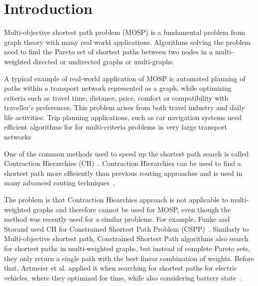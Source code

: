 % 
%  
%  
%  

\section{Introduction} \label{secIntroduction}

Multi-objective shortest path problem (MOSP) is a fundamental problem from
graph theory with many real world applications. Algorithms solving the problem
need to find the Pareto set of shortest paths between two nodes in a
multi-weighted directed or undirected graphs or multi-graphs. 

A typical example of real-world application of MOSP is automated planning of
paths within a transport network represented as a graph, while optimizing
criteria such as travel time, distance, price, comfort or compatibility with
traveller's preferences. This problem arises from both travel industry and
daily life activities. Trip planning applications, such as car navigation
systems need efficient algorithms for for multi-criteria problems in very large
transport 
networks~\cite{duque2015exact}



One of the common methods used to speed up the shortest path search  is called
Contraction Hierarchies (CH)~\cite{geisberger2008contraction}. Contraction
Hierarchies can be used to find a shortest path more efficiently than previous
routing approaches and is used in many advanced routing
techniques~\cite{delling2009engineering}. 

The problem is that Contraction Hiearchies approach is not applicable to multi-weighted
graphs and therefore cannot be used for MOSP, even though the method was
recently used for a similar problems. For example, Funke and Storand used CH for Constrained Shortest Path Problem (CSPP)~\cite{pugliese2013survey,funke2013polynomial}. Similarly to Multi-objective shortest path, Constrained Shortest Path algorithms also search
for shortest paths in multi-weighted graphs, but instead of complete Pareto
sets, they only return a single path with the best linear combination of
weights. Before that, Artmeier et al. applied it when searching for shortest paths for electric vehicles, where they optimized for
time, while also considering battery state~\cite{artmeier2010shortest}. 


